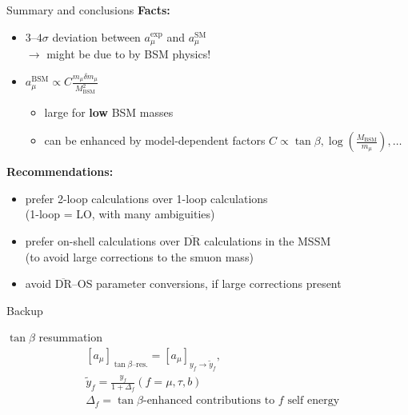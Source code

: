 \documentclass[hyperref={pdfpagelabels=false},ngerman]{beamer}
\newcommand{\mycite}[1]{\textcolor{darkgray}{\tiny [#1]}}
\renewcommand{\emph}{\textbf}
\newcommand{\DRbar}{\ensuremath{\overline{\text{DR}}}\xspace}
\newcommand{\SM}{\ensuremath{\text{SM}}}
\newcommand{\amu}{a_\mu}
\newcommand{\amuexp}{\amu^{\text{exp}}}
\newcommand{\amuSM}{\amu^{\SM}}
\begin{document}

\begin{frame}{Summary and conclusions}
  \emph{Facts:}
  \begin{itemize}
  \item $3$--$4\sigma$ deviation between $\amuexp$ and $\amuSM$ \\
    $\rightarrow$ might be due to by BSM physics!
  \item $a_\mu^\text{BSM} \propto C \frac{m_\mu \delta m_\mu}{M_\text{BSM}^2}$
    \begin{itemize}
    \item large for \emph{low} BSM masses
    \item can be enhanced by model-dependent factors $C \propto
      \tan\beta, \log(\frac{M_\text{BSM}}{m_\mu}), \ldots$
    \end{itemize}
  \end{itemize}
  \emph{Recommendations:}
  \begin{itemize}
  \item prefer 2-loop calculations over 1-loop calculations\\
    (1-loop = LO, with many ambiguities)
  \item prefer on-shell calculations over \DRbar calculations in the MSSM\\
    (to avoid large corrections to the smuon mass)
  \item avoid \DRbar--OS parameter conversions, if large corrections
    present
  \end{itemize}
\end{frame}


\begin{frame}[noframenumbering]
  \begin{center}
    \Huge Backup
  \end{center}
\end{frame}

\begin{frame}[noframenumbering]{$\tan\beta$ resummation}
  \begin{align*}
    &[\amu]_{\tan\beta\text{--res.}} = [\amu]_{y_f \rightarrow \tilde{y}_f}, \\
    &\tilde{y}_f = \frac{y_f}{1 + \Delta_f}
    (f = \mu, \tau, b) \\
    &\Delta_f = \tan\beta\text{-enhanced contributions to $f$ self energy}
  \end{align*}
\end{frame}
\end{document}
